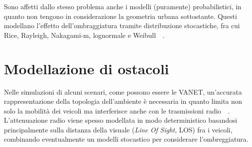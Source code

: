 Sono affetti dallo stesso problema anche i modelli (puramente) probabilistici, in quanto non tengono in considerazione la geometria urbana sottostante.
Questi modellano l'effetto dell'ombraggiatura tramite distribuzione stocastiche, fra cui Rice, Rayleigh, Nakagami-m, lognormale e Weibull~\cite{6554832}~\cite{Rappaport:2001:WCP:559977}.
%
\section{Modellazione di ostacoli}\label{sec:modellazione-ostacoli}
Nelle simulazioni di alcuni scenari, come possono essere le VANET, un'accurata rappresentazione della topologia dell'ambiente è necessaria
in quanto limita non solo la mobilità dei veicoli ma interferisce anche con le trasmissioni radio~\cite{7543980}~\cite{amjad2015impact}.
L'attenuazione radio viene spesso modellata in modo deterministico basandosi principalmente sulla distanza della visuale (\textit{Line Of Sight}, LOS)
fra i veicoli, combinando eventualmente un modelli stocastico per considerare l'ombreggiatura.

